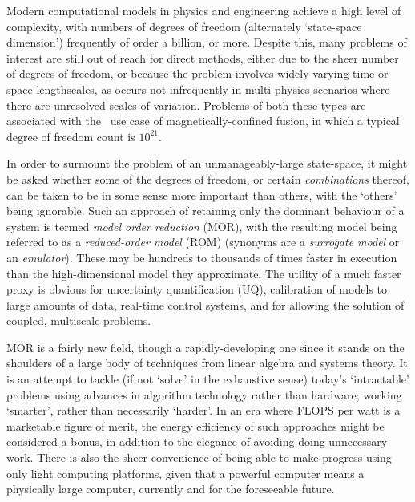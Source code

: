 Modern computational models in physics and engineering achieve a high level of complexity, with numbers of degrees of freedom (alternately `state-space dimension') frequently of order a billion, or more.  
Despite this, many problems of interest are still out of reach for direct methods, either due to the sheer number of degrees of freedom, or because the problem involves widely-varying time or space lengthscales, as occurs not infrequently in multi-physics scenarios where there are unresolved scales of variation.  
Problems of both these types are associated with the \nep\ use case of magnetically-confined fusion, in which a typical degree of freedom count is $10^{21}$.  

In order to surmount the problem of an unmanageably-large state-space, it might be asked whether some of the degrees of freedom, or certain {\it combinations} thereof, can be taken to be in some sense more important than others, with the `others' being ignorable.  
Such an approach of retaining only the dominant behaviour of a system is termed {\it model order reduction} (MOR), with the resulting model being referred to as a {\it reduced-order model} (ROM) (synonyms are a {\it surrogate model} or an {\it emulator}).  
These may be hundreds to thousands of times faster in execution than the high-dimensional model they approximate.  
The utility of a much faster proxy is obvious for uncertainty quantification (UQ), calibration of models to large amounts of data, real-time control systems, and for allowing the solution of coupled, multiscale problems.  

MOR is a fairly new field, though a rapidly-developing one since it stands on the shoulders of a large body of techniques from linear algebra and systems theory.  
It is an attempt to tackle (if not `solve' in the exhaustive sense) today's `intractable' problems using advances in algorithm technology rather than hardware; working `smarter', rather than necessarily `harder'.  
In an era where FLOPS per watt is a marketable figure of merit, the energy efficiency of such approaches might be considered a bonus, in addition to the elegance of avoiding doing unnecessary work.  
There is also the sheer convenience of being able to make progress using only light computing platforms, given that a powerful computer means a physically large computer, currently and for the foreseeable future.

